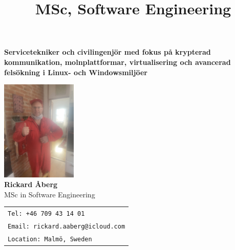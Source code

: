 \documentclass[11pt,a4paper,sans]{moderncv}
\title{MSc, Software Engineering}
\makeatletter
\let\oldmakecvtitle\makecvtitle
\renewcommand*{\makecvtitle}{%
    \vspace*{-1em}
    \begin{center}
      \texttt{[image: \\@photo]}
    \end{center}
    \vspace{0.5em}
    \oldmakecvtitle
  }%
\makeatother
\begin{document}
\begin{center}
  
\vspace{1cm}
\begin{center}
    \large\textbf{Servicetekniker och civilingenjör med fokus på krypterad kommunikation, molnplattformar, virtualisering och avancerad felsökning i Linux- och Windowsmiljöer}
\end{center}
\vspace{1cm}

    
    \includegraphics[width=3.6cm]{../../roles_CVs/photos/rickardaberg-service-tekniker.jpeg
} \\[1em]
    
    {\LARGE \textbf{Rickard Åberg}}\\[0.2em]
    {\large MSc in Software Engineering}\\[2em]
  
{\footnotesize
\begin{tabular}{l}
\texttt{Tel: +46 709 43 14 01} \\
\texttt{Email: rickard.aaberg@icloud.com} \\
\texttt{Location: Malmö, Sweden}
\end{tabular}
}
  
    \vspace*{1cm}
\end{center}
\newpage

\renewcommand*{\namefont}{\LARGE\sffamily\mdseries}
\renewcommand*{\titlefont}{\Large\sffamily\mdseries}






%





\end{document}
